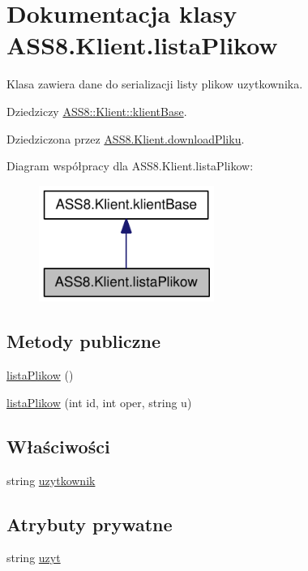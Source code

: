 \hypertarget{a00015}{
\section{Dokumentacja klasy ASS8.Klient.listaPlikow}
\label{dd/d1b/a00015}
}
Klasa zawiera dane do serializacji listy plikow uzytkownika.  


Dziedziczy \hyperlink{a00007}{ASS8::Klient::klientBase}.

Dziedziczona przez \hyperlink{a00002}{ASS8.Klient.downloadPliku}.

Diagram współpracy dla ASS8.Klient.listaPlikow:\nopagebreak
\begin{figure}[H]
\begin{center}
\leavevmode
\includegraphics[width=162pt]{da/deb/a00189}
\end{center}
\end{figure}
\subsection*{Metody publiczne}
\begin{CompactItemize}
\item 
\hyperlink{a00015_db427e61ff4a681f4f5c8b14e03ca3f9}{listaPlikow} ()
\item 
\hyperlink{a00015_925a91ea5825c2e2d1e8aa98067a6196}{listaPlikow} (int id, int oper, string u)
\end{CompactItemize}
\subsection*{Właściwości}
\begin{CompactItemize}
\item 
string \hyperlink{a00015_87d283970184c0a6185983930bd4c6f0}{uzytkownik}
\end{CompactItemize}
\subsection*{Atrybuty prywatne}
\begin{CompactItemize}
\item 
string \hyperlink{a00015_5dbe6847bccf04113c46e7a32e7ccfa0}{uzyt}
\end{CompactItemize}


